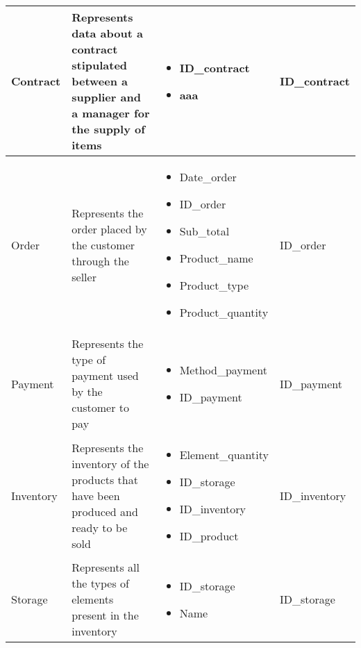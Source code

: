 \begin{longtable}{|p{}|p{} |p{}|p{} |}
    Contract & Represents data about a contract stipulated between a supplier and a manager for the supply of items &
    \begin{itemize}
        \vspace{-1em}
        \item ID\_contract
        \item aaa
    \end{itemize}
    &  ID\_contract\\\hline

    Order & Represents the order placed by the customer through the seller &
    \begin{itemize}
        \vspace{-1em}
        \item Date\_order
        \item ID\_order
        \item Sub\_total
        \item Product\_name
        \item Product\_type
        \item Product\_quantity
    \end{itemize}
    &  ID\_order\\\hline

    Payment & Represents the type of payment used by the customer to pay &
    \begin{itemize}
        \vspace{-1em}
        \item Method\_payment
        \item ID\_payment
    \end{itemize}
    &  ID\_payment\\\hline

    Inventory & Represents the inventory of the products that have been produced and ready to be sold &
    \begin{itemize}
        \vspace{-1em}
        \item Element\_quantity
        \item ID\_storage
        \item ID\_inventory
        \item ID\_product
    \end{itemize}
    &  ID\_inventory \\\hline

    Storage & Represents all the types of elements present in the inventory &
        \begin{itemize}
            \vspace{-1em}
            \item ID\_storage
            \item Name
        \end{itemize}
    &  ID\_storage \\\hline


\end{longtable}

